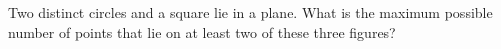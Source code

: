 Two distinct circles and a square lie in a plane. What is the maximum possible number of points that lie on at least two of these three figures?
